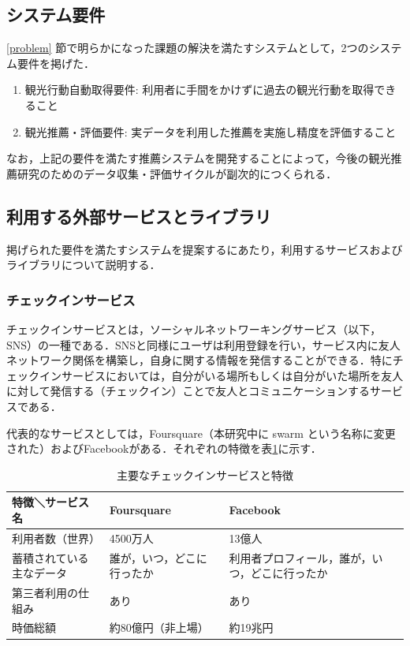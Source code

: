 \documentclass{jsarticle}
\begin{document}
\newpage
\subsection{システム要件}

\ref{problem} 節で明らかになった課題の解決を満たすシステムとして，2つのシステム要件を掲げた．

\begin{enumerate}
\item 観光行動自動取得要件: 利用者に手間をかけずに過去の観光行動を取得できること
\item 観光推薦・評価要件: 実データを利用した推薦を実施し精度を評価すること
\end{enumerate}

なお，上記の要件を満たす推薦システムを開発することによって，今後の観光推薦研究のためのデータ収集・評価サイクルが副次的につくられる．

\subsection{利用する外部サービスとライブラリ}

掲げられた要件を満たすシステムを提案するにあたり，利用するサービスおよびライブラリについて説明する．

\subsubsection{チェックインサービス}

チェックインサービスとは，ソーシャルネットワーキングサービス（以下，SNS）の一種である．SNSと同様にユーザは利用登録を行い，サービス内に友人ネットワーク関係を構築し，自身に関する情報を発信することができる．特にチェックインサービスにおいては，自分がいる場所もしくは自分がいた場所を友人に対して発信する（チェックイン）ことで友人とコミュニケーションするサービスである．

代表的なサービスとしては，Foursquare\cite{foursquare}（本研究中に swarm という名称に変更された）およびFacebook\cite{facebook}がある．それぞれの特徴を表\ref{features_of_checkin_service}に示す．

\begin{table}[!h]
\small
\caption{主要なチェックインサービスと特徴}
\begin{center}
\begin{tabular}{lll}
\label{features_of_checkin_service}
特徴＼サービス名            & Foursquare                    & Facebook \\ \hline
利用者数（世界）            & 4500万人                      & 13億人 \\
蓄積されている主なデータ    & 誰が，いつ，どこに行ったか    & 利用者プロフィール，誰が，いつ，どこに行ったか \\
第三者利用の仕組み          & あり                          & あり \\
時価総額                    & 約80億円（非上場）            & 約19兆円 \\
\end{tabular}
\end{center}
\end{table}
\end{document}
